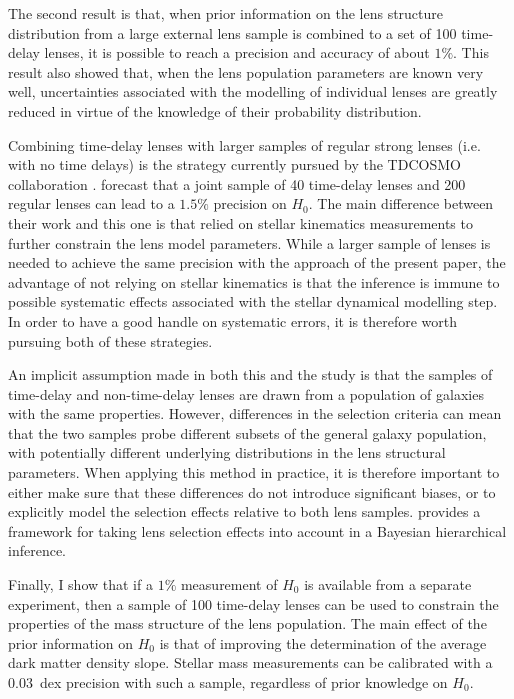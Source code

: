 \documentclass{aa}
\begin{document}
The second result is that, when prior information on the lens structure distribution from a large external lens sample is combined to a set of 100 time-delay lenses, it is possible to reach a precision and accuracy of about $1\%$. 
This result also showed that, when the lens population parameters are known very well, uncertainties associated with the modelling of individual lenses are greatly reduced in virtue of the knowledge of their probability distribution.

Combining time-delay lenses with larger samples of regular strong lenses (i.e. with no time delays) is the strategy currently pursued by the TDCOSMO collaboration \citep{Bir++20,B+T21}.
\citet{B+T21} forecast that a joint sample of 40 time-delay lenses and 200 regular lenses can lead to a $1.5\%$ precision on $H_0$. The main difference between their work and this one is that \citet{B+T21} relied on stellar kinematics measurements to further constrain the lens model parameters. While a larger sample of lenses is needed to achieve the same precision with the approach of the present paper, the advantage of not relying on stellar kinematics is that the inference is immune to possible systematic effects associated with the stellar dynamical modelling step.
In order to have a good handle on systematic errors, it is therefore worth pursuing both of these strategies.

An implicit assumption made in both this and the \citet{B+T21} study is that the samples of time-delay and non-time-delay lenses are drawn from a population of galaxies with the same properties.
However, differences in the selection criteria can mean that the two samples probe different subsets of the general galaxy population, with potentially different underlying distributions in the lens structural parameters.
When applying this method in practice, it is therefore important to either make sure that these differences do not introduce significant biases, or to explicitly model the selection effects relative to both lens samples.
\citet[][, Paper III]{Son21b} provides a framework for taking lens selection effects into account in a Bayesian hierarchical inference.

Finally, I show that if a $1\%$ measurement of $H_0$ is available from a separate experiment, then a sample of 100 time-delay lenses can be used to constrain the properties of the mass structure of the lens population. The main effect of the prior information on $H_0$ is that of improving the determination of the average dark matter density slope.
Stellar mass measurements can be calibrated with a $0.03$~dex precision with such a sample, regardless of prior knowledge on $H_0$.
\end{document}
